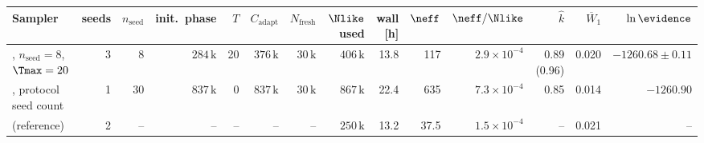 \begin{tabular}{@{}lrrrrrrrrrrrrr@{}}
  \toprule
  Sampler & seeds & \(n_{\mathrm{seed}}\) & init.\ phase & \(T\) & \(C_{\mathrm{adapt}}\) & \(N_{\mathrm{fresh}}\) & \(\Nlike\) used & wall [h] & \(\neff\) & \(\neff/\Nlike\) & \(\hat k\) & \(\overline{W}_1\) & \(\ln\evidence\) \\
  \midrule
  \mw{}, \(n_{\mathrm{seed}} = 8\), \(\Tmax = 20\) & 3 & 8 & \(284\,\mathrm{k}\) & 20 & \(376\,\mathrm{k}\) & \(30\,\mathrm{k}\) & \(406\,\mathrm{k}\) & 13.8 & 117 & \(2.9 \times 10^{-4}\) & 0.89 (0.96) & 0.020 & \(-1260.68 \pm 0.11\) \\
  \mw{}, protocol seed count & 1 & 30 & \(837\,\mathrm{k}\) & 0 & \(837\,\mathrm{k}\) & \(30\,\mathrm{k}\) & \(867\,\mathrm{k}\) & 22.4 & 635 & \(7.3 \times 10^{-4}\) & 0.85 & 0.014 & \(-1260.90\) \\
  \mh{} (reference) & 2 & -- & -- & -- & -- & -- & \(250\,\mathrm{k}\) & 13.2 & 37.5 & \(1.5 \times 10^{-4}\) & -- & 0.021 & -- \\
  \bottomrule
\end{tabular}
